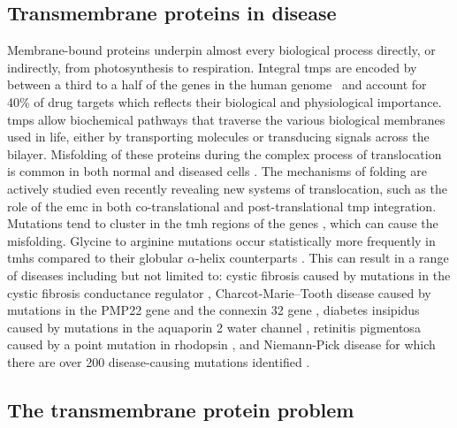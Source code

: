 \subsection{Transmembrane proteins in disease}
Membrane\--bound proteins underpin almost every biological process directly, or indirectly, from photosynthesis to respiration.
Integral \gls{tmp}s are encoded by between a third to a half of the genes in the human genome~\cite{Hopkins2002, Almen2009, Wang2013} and account for 40\% of drug targets \cite{Overington2006} which reflects their biological and physiological importance.
\gls{tmp}s allow biochemical pathways that traverse the various biological membranes used in life, either by transporting molecules or transducing signals across the bilayer.
Misfolding of these proteins during the complex process of translocation is common in both normal and diseased cells \cite{Ruggiano2014}.
The mechanisms of folding are actively studied even recently revealing new systems of translocation, such as the role of the \gls{emc} in both co\--translational \cite{Shurtleff2018} and post\--translational \cite{Guna2018} \gls{tmp} integration.
Mutations tend to cluster in the \gls{tmh} regions of the genes \cite{Sanders2004}, which can cause the misfolding.
Glycine to arginine mutations occur statistically more frequently in \gls{tmh}s compared to their globular $\alpha$\--helix counterparts \cite{Partridge2002}.
This can result in a range of diseases including but not limited to: cystic fibrosis caused by mutations in the cystic fibrosis conductance regulator \cite{Riordan1989}, Charcot\--Marie\---Tooth disease caused by mutations in the PMP22 gene \cite{Roa1993} and the connexin 32 gene \cite{Fairweather1994}, diabetes insipidus caused by mutations in the aquaporin 2 water channel \cite{vanLieburg1994}, retinitis pigmentosa caused by a point mutation in rhodopsin \cite{Dryja1990}, and Niemann\--Pick disease for which there are over 200 disease\--causing mutations identified \cite{Gelsthorpe2008, Park2003, Scott2004, Fernandez-Valero2005}.

\subsection{The transmembrane protein problem}

